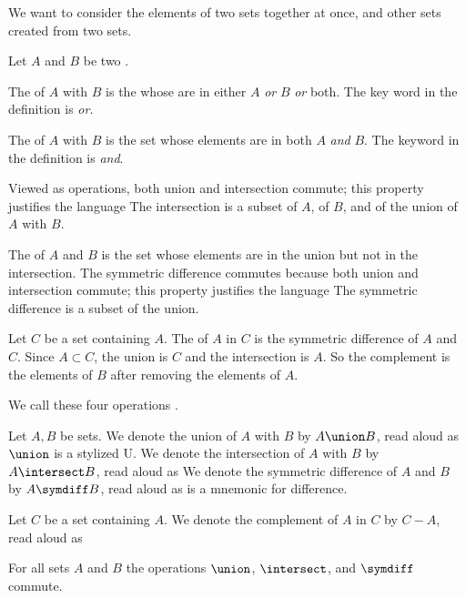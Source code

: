 

We want to consider the elements of two sets
together at once, and other sets created
from two sets.


Let $A$ and $B$ be two .

The  of $A$ with $B$ is the
 whose  are
in either $A$ \textit{or} $B$ \textit{or} both.
The key word in the definition is \textit{or}.

The  of $A$ with $B$ is
the set whose elements are in both $A$ \textit{and} $B$.
The keyword in the definition is \textit{and}.

Viewed as operations, both union and intersection commute;
this property justifies the language 
The intersection is a subset of $A$, of $B$,
and of the union of $A$ with $B$.

The 
of $A$ and $B$ is the set whose elements are in the union
but not in the intersection.
The symmetric difference commutes because both union and
intersection commute; this property justifies the
language 
The symmetric difference is a subset of the union.


Let $C$ be a set containing $A$.
The  of $A$ in $C$ is
the symmetric difference of $A$ and $C$.
Since $A \subset C$, the union is $C$ and the
intersection is $A$.
So the complement is the  elements of $B$ after removing the elements of $A$.

We call these four operations
.


Let $A, B$ be sets.
We denote the union of $A$ with $B$ by $A \union B$, read aloud as 
$\union$ is a stylized U.
We denote the intersection of $A$ with $B$ by $A \intersect B$, read aloud as 
We denote the symmetric difference of $A$ and $B$ by $A \symdiff B$, read aloud as 
 is a mnemonic for difference.

Let $C$ be a set containing $A$.
We denote the complement of $A$ in $C$ by $C - A$, read aloud as 


\begin{prop}
  For all sets $A$ and $B$ the operations $\union$, $\intersect$, and $\symdiff$ commute.
\end{prop}

